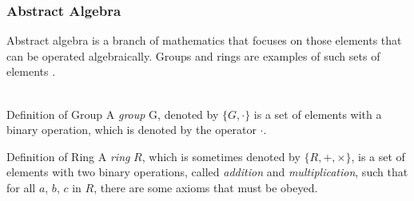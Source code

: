 \documentclass{beamer}
\begin{document}
\begin{frame}
\frametitle{Abstract Algebra}

Abstract algebra is a branch of mathematics that focuses on those elements that can be operated algebraically. Groups and rings are examples of such sets of elements \cite{CryptoStallings}. \\~\\
\begin{block}{Definition of Group}
A \emph{group} G, denoted by $\{ G, \cdot \}$ is a set of elements with a binary operation, which is denoted by the operator $\cdot$.
\end{block}

\begin{block}{Definition of Ring}
A \emph{ring} $R$, which is sometimes denoted by $\{R, +, \times \}$, is a set of elements with two binary operations, called \textit{addition} and \textit{multiplication}, such that for all $a$, $b$, $c$ in $R$, there are some axioms that must be obeyed.
\end{block}

\end{frame}

\end{document}
